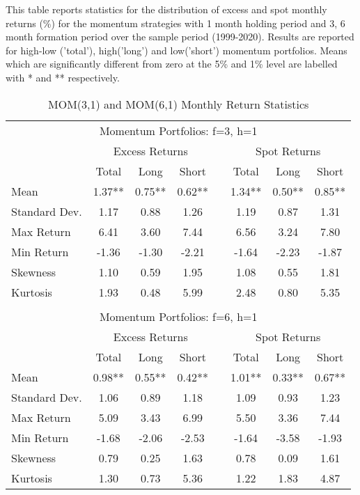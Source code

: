 \documentclass{article}
\begin{document}
\begin{table}[t!]
  \centering
  \caption{MOM(3,1) and MOM(6,1) Monthly Return Statistics}
  This table reports statistics for the distribution of excess and spot monthly returns (\%) for the momentum strategies with 1 month holding period and 3, 6 month formation period over the sample period (1999-2020). Results are reported for high-low ('total'), high('long') and low('short') momentum portfolios. Means which are significantly different from zero at the 5\% and 1\% level are labelled with * and ** respectively.
    \begin{tabular}{lccccccc}
          &       &       &       &       &       &       &  \\
    \midrule
    \multicolumn{8}{c}{Momentum Portfolios: f=3, h=1} \\
    \midrule
          & \multicolumn{3}{c}{Excess Returns} &       & \multicolumn{3}{c}{Spot Returns} \\
    \midrule
          & Total & Long  & Short &       & Total & Long  & Short \\
    \midrule
    Mean  & 1.37** & 0.75** & 0.62** &       & 1.34** & 0.50** & 0.85** \\
    Standard Dev. & 1.17  & 0.88  & 1.26  &       & 1.19  & 0.87  & 1.31 \\
    Max Return & 6.41  & 3.60  & 7.44  &       & 6.56  & 3.24  & 7.80 \\
    Min Return & -1.36 & -1.30 & -2.21 &       & -1.64 & -2.23 & -1.87 \\
    Skewness & 1.10  & 0.59  & 1.95  &       & 1.08  & 0.55  & 1.81 \\
    Kurtosis & 1.93  & 0.48  & 5.99  &       & 2.48  & 0.80  & 5.35 \\
    \midrule
          &       &       &       &       &       &       &  \\
    \multicolumn{8}{c}{Momentum Portfolios: f=6, h=1} \\
    \midrule
          & \multicolumn{3}{c}{Excess Returns} &       & \multicolumn{3}{c}{Spot Returns} \\
    \midrule
          & Total & Long  & Short &       & Total & Long  & Short \\
    \midrule
    Mean  & 0.98** & 0.55** & 0.42** &       & 1.01** & 0.33** & 0.67** \\
    Standard Dev. & 1.06  & 0.89  & 1.18  &       & 1.09  & 0.93  & 1.23 \\
    Max Return & 5.09  & 3.43  & 6.99  &       & 5.50  & 3.36  & 7.44 \\
    Min Return & -1.68 & -2.06 & -2.53 &       & -1.64 & -3.58 & -1.93 \\
    Skewness & 0.79  & 0.25  & 1.63  &       & 0.78  & 0.09  & 1.61 \\
    Kurtosis & 1.30  & 0.73  & 5.36  &       & 1.22  & 1.83  & 4.87 \\
    \bottomrule
    \end{tabular}%
  \label{MRS}%
\end{table}%
\end{document}
